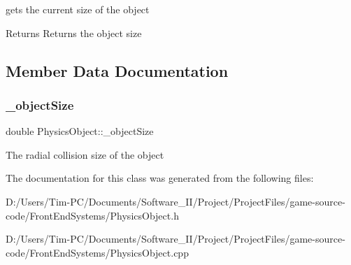 gets the current size of the object 

\begin{DoxyReturn}{Returns}
Returns the object size 
\end{DoxyReturn}


\subsection{Member Data Documentation}
\mbox{\label{class_physics_object_a417a7eb051cfcfdbf8dfd0cc0875fa0d}} 
\subsubsection{\texorpdfstring{\+\_\+object\+Size}{\_objectSize}}
{\footnotesize\ttfamily double Physics\+Object\+::\+\_\+object\+Size\hspace{0.3cm}{\ttfamily [protected]}}

The radial collision size of the object 

The documentation for this class was generated from the following files\+:\begin{DoxyCompactItemize}
\item 
D\+:/\+Users/\+Tim-\/\+P\+C/\+Documents/\+Software\+\_\+\+I\+I/\+Project/\+Project\+Files/game-\/source-\/code/\+Front\+End\+Systems/Physics\+Object.\+h\item 
D\+:/\+Users/\+Tim-\/\+P\+C/\+Documents/\+Software\+\_\+\+I\+I/\+Project/\+Project\+Files/game-\/source-\/code/\+Front\+End\+Systems/Physics\+Object.\+cpp\end{DoxyCompactItemize}

